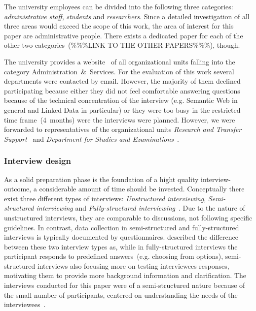 \documentclass{article}
\begin{document}
The university employees can be divided into the following three categories: \textit{administrative staff}, \textit{students} and \textit{researchers}. Since a detailed investigation of all three areas would exceed the scope of this work, the area of interest for this paper are administrative people. There exists a dedicated paper for each of the other two categories~(\%\%\%LINK TO THE OTHER PAPERS\%\%\%), though. 

The university provides a website~\cite{url:university-list-of-org-units} of all organizational units falling into the category Administration~\&~Services. For the evaluation of this work several departments were contacted by email. However, the majority of them declined participating because either they did not feel comfortable answering questions because of the technical concentration of the interview (e.g. Semantic Web in general and Linked Data in particular) or they were too busy in the restricted time frame~(4~months) were the interviews were planned. However, we were forwarded to representatives of the organizational units \textit{Research and Transfer Support}~\cite{url:university-research-transfer} and \textit{Department for Studies and Examinations}~\cite{url:university-studies-and-examinations}. 
\subsubsection{Interview design}
As a solid preparation phase is the foundation of a hight quality interview-outcome, a considerable amount of time should be invested. Conceptually there exist three different types of interviews: \textit{Unstructured interviewing}, \textit{Semi-structured interviewing} and \textit{Fully-structured interviewing}~\cite{book:bernard-antropology-semi-structured-interview}. 
Due to the nature of unstructured interviews, they are comparable to discussions, not following specific guidelines. In contrast, data collection in semi-structured and fully-structured interviews is typically documented by questionnaires. \citet{article:harris2010mixing} described the difference between these two interview types as, while in fully-structured interviews the participant responds to predefined answers~(e.g. choosing from options), semi-structured interviews also focusing more on testing interviewees responses, motivating them to provide more background information and clarification. The interviews conducted for this paper were of a semi-structured nature because of the small number of participants, centered on understanding the needs of the interviewees~\cite{book:miles2005handbook}. 
\end{document}
